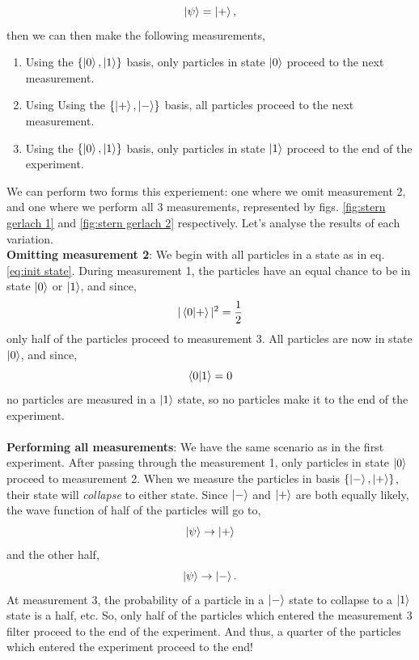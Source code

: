 \documentclass{book}
\begin{document}
\begin{equation}
	\ket{\psi} = \ket{+}, \label{eq:init state}
\end{equation}
then we can then make the following measurements,
\begin{enumerate}[start = 1, label={\bfseries Measurement \arabic*:}]
	\item Using the $\left\{\ket{0},\ket{1}\right\}$ basis, only particles in state $\ket{0}$ proceed to the next measurement.
	\item Using Using the $\left\{\ket{+},\ket{-}\right\}$ basis, all particles proceed to the next measurement.
	\item Using the $\left\{\ket{0},\ket{1}\right\}$ basis, only particles in state $\ket{1}$ proceed to the end of the experiment.
\end{enumerate}
We can perform two forms this experiement: one where we omit measurement 2, and one where we perform all 3 measurements, represented by figs. \ref{fig:stern gerlach 1} and \ref{fig:stern gerlach 2} respectively. Let's analyse the results of each variation.
\\
\textbf{Omitting measurement 2}: We begin with all particles in a state as in eq. \eqref{eq:init state}. During measurement 1, the particles have an equal chance to be in state $\ket{0}$ or $\ket{1}$, and since,
\begin{equation}
	|\braket{0}{+}|^2 = \frac{1}{2}
\end{equation}
only half of the particles proceed to measurement 3. All particles are now in state $\ket{0}$, and since,
\begin{equation}
	\braket{0}{1} = 0
\end{equation}
no particles are measured in a $\ket{1}$ state, so no particles make it to the end of the experiment.
\\\\
\textbf{Performing all measurements}: We have the same scenario as in the first experiment. After passing through the measurement 1, only particles in state $\ket{0}$ proceed to measurement 2. When we measure the particles in basis $\left\{\ket{-}, \ket{+}\right\}$, their state will \textit{collapse} to either state. Since $\ket{-}$ and $\ket{+}$ are both equally likely, the wave function of half of the particles will go to,
\begin{equation}
	\ket{\psi} \to \ket{+}
\end{equation}
and the other half,
\begin{equation}
	\ket{\psi} \to \ket{-}.
\end{equation}
At measurement 3, the probability of a particle in a $\ket{-}$ state to collapse to a $\ket{1}$ state is a half, etc. So, only half of the particles which entered the measurement 3 filter proceed to the end of the experiment. And thus, a quarter of the particles which entered the experiment proceed to the end!
\end{document}
